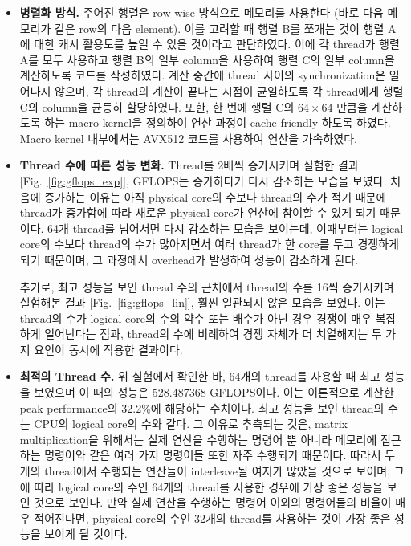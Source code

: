 \begin{itemize}

    \item {
        \textbf{병렬화 방식.}
        주어진 행렬은 row-wise 방식으로 메모리를 사용한다 (바로 다음 메모리가 같은 row의 다음 element).
        이를 고려할 때 행렬 B를 쪼개는 것이 행렬 A에 대한 캐시 활용도를 높일 수 있을 것이라고 판단하였다.
        이에 각 thread가 행렬 A를 모두 사용하고 행렬 B의 일부 column을 사용하여 행렬 C의 일부 column을
        계산하도록 코드를 작성하였다.
        계산 중간에 thread 사이의 synchronization은 일어나지 않으며, 각 thread의 계산이 끝나는
        시점이 균일하도록 각 thread에게 행렬 C의 column을 균등히 할당하였다.
        또한, 한 번에 행렬 C의 $64 \times 64$ 만큼을 계산하도록 하는 macro kernel을 정의하여
        연산 과정이 cache-friendly 하도록 하였다. Macro kernel 내부에서는 AVX512 코드를 사용하여
        연산을 가속하였다.
    }
    \item {
        \textbf{Thread 수에 따른 성능 변화.}
        Thread를 2배씩 증가시키며 실험한 결과[Fig.~{\ref{fig:gflops_exp}}],
        GFLOPS는 증가하다가 다시 감소하는 모습을 보였다.
        처음에 증가하는 이유는 아직 physical core의 수보다 thread의 수가 적기 때문에 thread가 증가함에 따라
        새로운 physical core가 연산에 참여할 수 있게 되기 때문이다.
        64개 thread를 넘어서면 다시 감소하는 모습을 보이는데, 이때부터는 logical core의 수보다
        thread의 수가 많아지면서 여러 thread가 한 core를 두고 경쟁하게 되기 때문이며,
        그 과정에서 overhead가 발생하여 성능이 감소하게 된다.

        추가로, 최고 성능을 보인 thread 수의 근처에서 thread의 수를 16씩 증가시키며 실험해본 결과
        [Fig.~{\ref{fig:gflops_lin}}], 훨씬 일관되지 않은 모습을 보였다.
        이는 thread의 수가 logical core의 수의 약수 또는 배수가 아닌 경우 경쟁이 매우 복잡하게 일어난다는 점과,
        thread의 수에 비례하여 경쟁 자체가 더 치열해지는 두 가지 요인이 동시에 작용한 결과이다.
    }
    \item {
        \textbf{최적의 Thread 수.}
        위 실험에서 확인한 바, 64개의 thread를 사용할 때 최고 성능을 보였으며 이 때의 성능은 528.487368 GFLOPS이다.
        이는 이론적으로 계산한 peak performance의 32.2\%에 해당하는 수치이다.
        최고 성능을 보인 thread의 수는 CPU의 logical core의 수와 같다. 그 이유로 추측되는 것은,
        matrix multiplication을 위해서는 실제 연산을 수행하는 명령어 뿐 아니라
        메모리에 접근하는 명령어와 같은 여러 가지 명령어들 또한 자주 수행되기 때문이다.
        따라서 두 개의 thread에서 수행되는 연산들이 interleave될 여지가 많았을 것으로 보이며,
        그에 따라 logical core의 수인 64개의 thread를 사용한 경우에 가장 좋은 성능을 보인 것으로 보인다.
        만약 실제 연산을 수행하는 명령어 이외의 명령어들의 비율이 매우 적어진다면, 
        physical core의 수인 32개의 thread를 사용하는 것이 가장 좋은 성능을 보이게 될 것이다.

}
\end{itemize}
